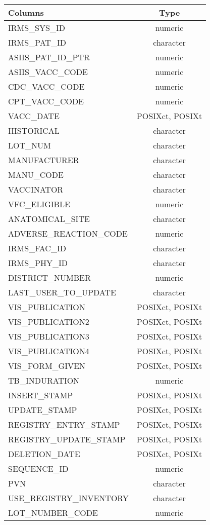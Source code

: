 \documentclass[
  letterpaper,
  DIV=11,
  numbers=noendperiod]{scrreprt}
\begin{document}
\begin{longtable}{lc}
\toprule
Columns & Type \\ 
\midrule
IRMS\_SYS\_ID & numeric \\ 
IRMS\_PAT\_ID & character \\ 
ASIIS\_PAT\_ID\_PTR & numeric \\ 
ASIIS\_VACC\_CODE & numeric \\ 
CDC\_VACC\_CODE & numeric \\ 
CPT\_VACC\_CODE & numeric \\ 
VACC\_DATE & POSIXct, POSIXt \\ 
HISTORICAL & character \\ 
LOT\_NUM & character \\ 
MANUFACTURER & character \\ 
MANU\_CODE & character \\ 
VACCINATOR & character \\ 
VFC\_ELIGIBLE & numeric \\ 
ANATOMICAL\_SITE & character \\ 
ADVERSE\_REACTION\_CODE & numeric \\ 
IRMS\_FAC\_ID & character \\ 
IRMS\_PHY\_ID & character \\ 
DISTRICT\_NUMBER & numeric \\ 
LAST\_USER\_TO\_UPDATE & character \\ 
VIS\_PUBLICATION & POSIXct, POSIXt \\ 
VIS\_PUBLICATION2 & POSIXct, POSIXt \\ 
VIS\_PUBLICATION3 & POSIXct, POSIXt \\ 
VIS\_PUBLICATION4 & POSIXct, POSIXt \\ 
VIS\_FORM\_GIVEN & POSIXct, POSIXt \\ 
TB\_INDURATION & numeric \\ 
INSERT\_STAMP & POSIXct, POSIXt \\ 
UPDATE\_STAMP & POSIXct, POSIXt \\ 
REGISTRY\_ENTRY\_STAMP & POSIXct, POSIXt \\ 
REGISTRY\_UPDATE\_STAMP & POSIXct, POSIXt \\ 
DELETION\_DATE & POSIXct, POSIXt \\ 
SEQUENCE\_ID & numeric \\ 
PVN & character \\ 
USE\_REGISTRY\_INVENTORY & character \\ 
LOT\_NUMBER\_CODE & numeric \\ 

\end{longtable}
\end{document}

